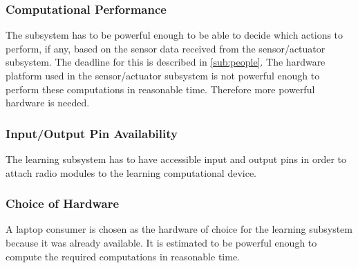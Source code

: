 \subsubsection{Computational Performance}
The subsystem has to be powerful enough to be able to decide which actions to perform, if any, based on the sensor data received from the sensor/actuator subsystem. The deadline for this is described in \cref{sub:people}. The hardware platform used in the sensor/actuator subsystem is not powerful enough to perform these computations in reasonable time. Therefore more powerful hardware is needed.

\subsubsection{Input/Output Pin Availability}
The learning subsystem has to have accessible input and output pins in order to attach radio modules to the learning computational device.

\subsubsection{Choice of Hardware}
A laptop consumer is chosen as the hardware of choice for the learning subsystem because it was already available. It is estimated to be powerful enough to compute the required computations in reasonable time.
